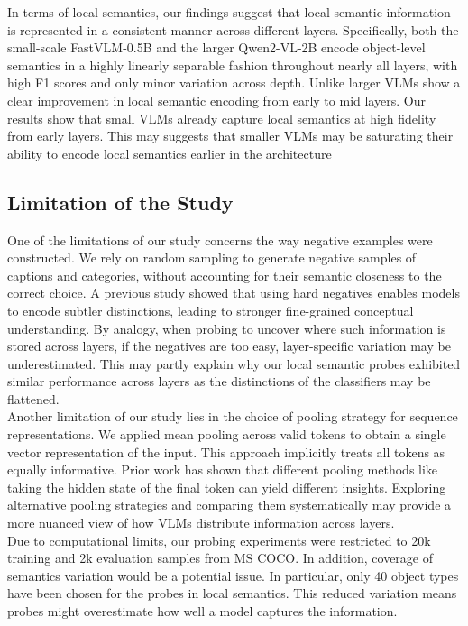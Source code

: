 \documentclass[11pt]{article}
\begin{document}
In terms of local semantics, our findings suggest that local semantic information is represented in a consistent manner across different layers.
Specifically, both the small-scale FastVLM-0.5B and the larger Qwen2-VL-2B encode object-level semantics in a highly linearly separable fashion throughout nearly all layers, with high F1 scores and only minor variation across depth.
Unlike larger VLMs show a clear improvement in local semantic encoding from early to mid layers. Our results show that small VLMs already capture local semantics at high fidelity from early layers.
This may suggests that smaller VLMs may be saturating their ability to encode local semantics earlier in the architecture

\subsection{Limitation of the Study}
One of the limitations of our study concerns the way negative examples were constructed. We rely on random sampling to generate negative samples of captions and categories, without accounting for their semantic closeness to the correct choice.
A previous study \cite{roesch2024EnhancingConceptualUnderstandinginMultimodal} showed that using hard negatives enables models to encode subtler distinctions, leading to stronger fine-grained conceptual understanding.
By analogy, when probing to uncover where such information is stored across layers, if the negatives are too easy, layer-specific variation may be underestimated.
This may partly explain why our local semantic probes exhibited similar performance across layers as the distinctions of the classifiers may be flattened. \\

Another limitation of our study lies in the choice of pooling strategy for sequence representations.
We applied mean pooling across valid tokens to obtain a single vector representation of the input. This approach implicitly treats all tokens as equally informative.
Prior work \cite{tang2024PoolingAndAttention} has shown that different pooling methods like taking the hidden state of the final token can yield different insights. Exploring alternative pooling strategies and comparing them systematically may provide a more nuanced view of how VLMs distribute information across layers. \\

Due to computational limits, our probing experiments were restricted to 20k training and 2k evaluation samples from MS COCO.
In addition, coverage of semantics variation would be a potential issue.
In particular, only 40 object types have been chosen for the probes in local semantics.
This reduced variation means probes might overestimate how well a model captures the information.
\end{document}
